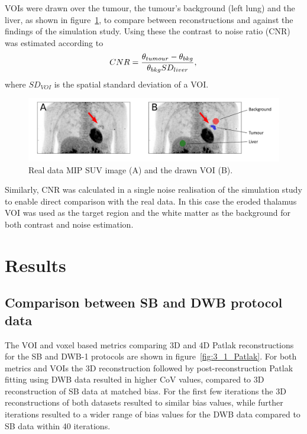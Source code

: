 VOIs were drawn over the tumour, the tumour's background (left lung) and the liver, as shown in figure~\ref{fig:2_5_VOIs}, to compare between reconstructions and against the findings of the simulation study. Using these the contrast to noise ratio (CNR) was estimated according to
\begin{equation}
CNR = \frac{\theta_{tumour} - \theta_{bkg}}{\theta_{bkg} SD_{liver}} \\, \\ 
\end{equation}
where $SD_{VOI}$ is the spatial standard deviation of a VOI. 
\begin{figure} [ht!]
\centering
\includegraphics[scale=0.47,angle=0]{3_Results/3_2_Dynamic_Reconstruction_SimulationStudy/figures/RealDataVOIs.pdf}
\caption{Real data MIP SUV image (A) and the drawn VOI (B).}
\label{fig:2_5_VOIs}
\end{figure} 

Similarly, CNR was calculated in a single noise realisation of the simulation study to enable direct comparison with the real data. In this case the eroded thalamus VOI was used as the target region and the white matter as the background for both contrast and noise estimation. 


\section{Results}
 
\subsection{Comparison between SB and DWB protocol data}
The VOI and voxel based metrics comparing 3D and 4D Patlak reconstructions for the SB and DWB-1 protocols are shown in figure~\ref{fig:3_1_Patlak}. For both metrics and VOIs the 3D reconstruction followed by post-reconstruction Patlak fitting using DWB data resulted in higher CoV values, compared to 3D reconstruction of SB data at matched bias. For the first few iterations the 3D reconstructions of both datasets resulted to similar bias values, while further iterations resulted to a wider range of bias values for the DWB data compared to SB data within 40 iterations.


